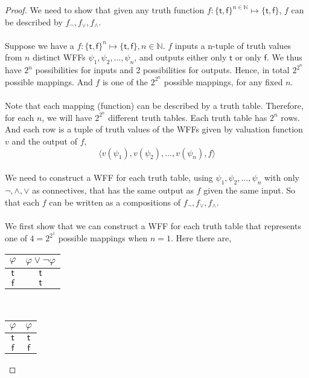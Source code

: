\documentclass[12pt]{article}
\begin{document}
\begin{proof}
    We need to show that given any truth function $f \colon \{\mathsf{t}, \mathsf{f}\}^{n \in \mathbb{N}} \longmapsto \{\mathsf{t}, \mathsf{f}\}$, $f$ can be described by $f_{\neg},f_{\lor}, f_{\land}$.\\
    \\
    Suppose we have a $f \colon \{\mathsf{t}, \mathsf{f}\}^n \longmapsto \{\mathsf{t}, \mathsf{f}\}, n \in \mathbb{N}$.
    $f$ inputs a n-tuple of truth values from $n$ distinct WFFs $\psi_1, \psi_2, \dots, \psi_n$, and outputs either only $\mathsf{t}$ or only $\mathsf{f}$.
    We thus have $2^n$ possibilities for inputs and 2 possibilities for outputs. 
    Hence, in total $2^{2^n}$ possible mappings.
    And $f$ is one of the $2^{2^n}$ possible mappings, for any fixed $n$.\\
    \\
    Note that each mapping (function) can be described by a truth table.
    Therefore, for each $n$, we will have $2^{2^n}$ different truth tables.
    Each truth table has $2^n$ rows.
    And each row is a tuple of truth values of the WFFs given by valuation function $v$ and the output of $f$,
    $$\langle v(\psi_1), v(\psi_2), \dots, v(\psi_n), f \rangle$$
    \\
    We need to construct a WFF for each truth table, using $\psi_1, \psi_2, \dots, \psi_n$ with only $\neg, \land, \lor$ as connectives, that has the same output as $f$ given the same input.
    So that each $f$ can be written as a compositions of $f_{\neg}, f_{\lor}, f_{\land}$.\\
    \\
    We first show that we can construct a WFF for each truth table that represents one of $4 = 2^{2^1}$ possible mappings when $n = 1$.
    Here there are,
    \begin{center}
        \begin{tabular}{c|c}
            $\varphi$ & $\varphi \lor \neg \varphi$\\ \hline
            $\mathsf{t}$ & $\mathsf{t}$\\
            $\mathsf{f}$ & $\mathsf{t}$\\
        \end{tabular}
        ~~~
        \begin{tabular}{c|c}
            $\varphi$ & $\varphi$ \\ \hline
            $\mathsf{t}$ & $\mathsf{t}$\\
            $\mathsf{f}$ & $\mathsf{f}$\\

\end{tabular}
\end{center}
\end{proof}
\end{document}
